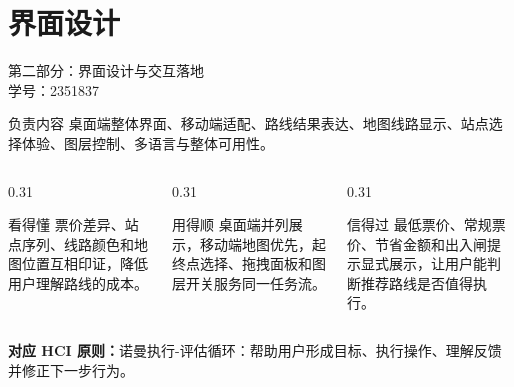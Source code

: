 \documentclass[aspectratio=169,10pt]{beamer}
\newcommand{\hciprinciple}[1]{\vspace{0.25em}\textcolor{MTRPurple}{\small\textbf{对应 HCI 原则：}#1}}
\newcommand{\speakerline}[2]{\centering{\Huge\bfseries #1}\\[0.8em]{\Large 学号：#2}\\[1.2em]}
\begin{document}
\section{界面设计}
\begin{frame}{第二部分：界面设计与交互落地}
  \small
  \speakerline{高胜寒}{2351837}
  \begin{block}{负责内容}
    桌面端整体界面、移动端适配、路线结果表达、地图线路显示、站点选择体验、图层控制、多语言与整体可用性。
  \end{block}
  \begin{columns}[T,onlytextwidth]
    \begin{column}{0.31\textwidth}
      \begin{block}{看得懂}
        票价差异、站点序列、线路颜色和地图位置互相印证，降低用户理解路线的成本。
      \end{block}
    \end{column}
    \begin{column}{0.31\textwidth}
      \begin{block}{用得顺}
        桌面端并列展示，移动端地图优先，起终点选择、拖拽面板和图层开关服务同一任务流。
      \end{block}
    \end{column}
    \begin{column}{0.31\textwidth}
      \begin{block}{信得过}
        最低票价、常规票价、节省金额和出入闸提示显式展示，让用户能判断推荐路线是否值得执行。
      \end{block}
    \end{column}
  \end{columns}
  \hciprinciple{诺曼执行-评估循环：帮助用户形成目标、执行操作、理解反馈并修正下一步行为。}
\end{frame}
\end{document}
